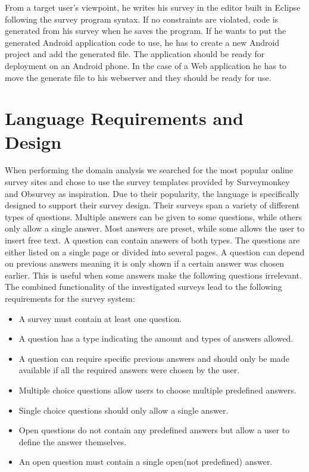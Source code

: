 \documentclass[runningheads]{llncs}
\begin{document}
From a target user's viewpoint, he writes his survey in the editor built in Eclipse following the survey program syntax. If no constraints are violated, code is generated from his survey when he saves the program. If he wants to put the generated Android application code to use, he has to create a new Android project and add the generated file. The application should be ready for deployment on an Android phone. In the case of a Web application he has to move the generate file to his webserver and they should be ready for use.

\section{Language Requirements and Design}
\label{sec:requirements_and_design}
When performing the domain analysis we searched for the most popular online survey sites and chose to use the survey templates provided by Surveymonkey \cite{surveymonkey} and Obsurvey \cite{obsurvey} as inspiration. Due to their popularity, the language is specifically designed to support their survey design. Their surveys span a variety of different types of questions. Multiple answers can be given to some questions, while others only allow a single answer. Most answers are preset, while some allows the user to insert free text. A question can contain answers of both types. The questions are either listed on a single page or divided into several pages. A question can depend on previous answers meaning it is only shown if a certain answer was chosen earlier. This is useful when some answers make the following questions irrelevant. The combined functionality of the investigated surveys lead to the following requirements for the survey system:
\begin{itemize}
\item A survey must contain at least one question. 
\item A question has a type indicating the amount and types of answers allowed. 
\item A question can require specific previous answers and should only be made available if all the required answers were chosen by the user. 
\item Multiple choice questions allow users to choose multiple predefined answers.
\item Single choice questions should only allow a single answer. 
\item Open questions do not contain any predefined answers but allow a user to define the answer themselves. 
\item An open question must contain a single open(not predefined) answer.
\end{itemize}
\end{document}
